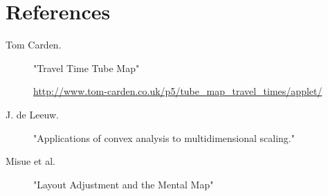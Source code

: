 \documentclass[a4paper, twocolumn,
final
]{article}
\begin{document}
\section*{References}

\begin{description}
\item[Tom Carden.] "Travel Time Tube Map"

  \url{http://www.tom-carden.co.uk/p5/tube_map_travel_times/applet/}
\item[J. de Leeuw.] "Applications of convex analysis to multidimensional scaling."
\item[Misue et al.] "Layout Adjustment and the Mental Map"
\end{description}
\end{document}
